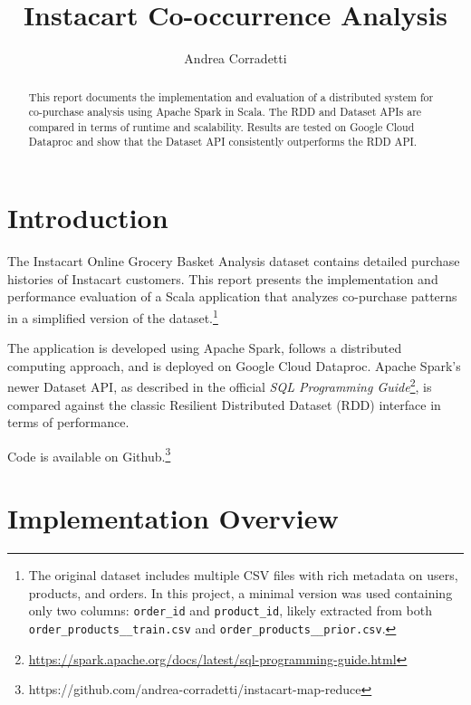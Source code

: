 \documentclass[sigconf,nonacm]{acmart}
\title{Instacart Co-occurrence Analysis}
\author{Andrea Corradetti}
\affiliation{%
  \institution{University of Bologna}
  \department{Department of Computer Science and Engineering}
  \city{Bologna}
  \country{Italy}
}
\begin{document}
\begin{abstract}
This report documents the implementation and evaluation of a distributed system for co-purchase analysis using Apache Spark in Scala. The RDD and Dataset APIs are compared in terms of runtime and scalability. Results are tested on Google Cloud Dataproc and show that the Dataset API consistently outperforms the RDD API.
\end{abstract}

\maketitle



\section{Introduction}

The Instacart Online Grocery Basket Analysis dataset contains detailed purchase histories of Instacart customers. This report presents the implementation and performance evaluation of a Scala application that analyzes co-purchase patterns in a simplified version of the dataset.\footnote{The original dataset includes multiple CSV files with rich metadata on users, products, and orders. In this project, a minimal version was used containing only two columns: \texttt{order\_id} and \texttt{product\_id}, likely extracted from both \texttt{order\_products\_\_train.csv} and \texttt{order\_products\_\_prior.csv}.}

The application is developed using Apache Spark, follows a distributed computing approach, and is deployed on Google Cloud Dataproc. Apache Spark's newer Dataset API, as described in the official \textit{SQL Programming Guide}\footnote{\url{https://spark.apache.org/docs/latest/sql-programming-guide.html}}, is compared against the classic Resilient Distributed Dataset (RDD) interface in terms of performance.

Code is available on Github.\footnote{https://github.com/andrea-corradetti/instacart-map-reduce}


\section{Implementation Overview}
\end{document}
